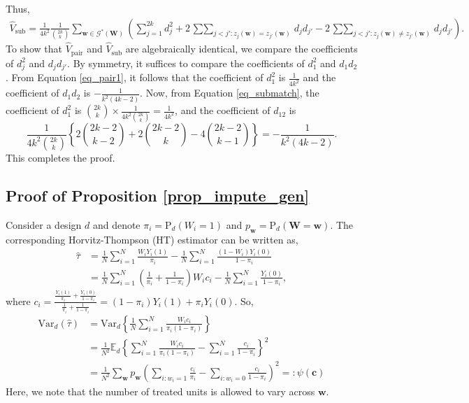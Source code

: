 \documentclass[12pt]{article}
\newcommand{\Var}{{\text{Var}}}
\newcommand{\E}{{\mathbb{E}}}
\renewcommand{\Pr}{{\text{P}}}
\begin{document}
Thus,
\begin{align}
    \hat{V}_{\text{sub}} = \frac{1}{4k^2}\frac{1}{\binom{2k}{k}} \sum_{\bm{w} \in \mathcal{G}^*(\bm{W})} \left(\sum_{j=1}^{2k}d^2_j + 2\mathop{\sum\sum}_{j <j':z_j(\bm{w}) = z_{j'}(\bm{w})}d_jd_{j'} - 2\mathop{\sum\sum}_{j <j':z_j(\bm{w}) \neq z_{j'}(\bm{w})}d_jd_{j'} \right). \label{eq_submatch}
\end{align}
To show that $\hat{V}_{\text{pair}}$ and $\hat{V}_{\text{sub}}$ are algebraically identical, we compare the coefficients of $d_j^2$ and $d_jd_{j'}$. By symmetry, it suffices to compare the coefficients of $d^2_1$ and $d_1d_2$. From Equation \ref{eq_pair1}, it follows that the coefficient of $d^2_1$ is $\frac{1}{4k^2}$ and the coefficient of $d_{1}d_{2}$ is $-\frac{1}{k^2(4k-2)}$. Now, from Equation \ref{eq_submatch}, the coefficient of $d^2_1$ is $\binom{2k}{k} \times \frac{1}{4k^2 \binom{2k}{k}} = \frac{1}{4k^2}$, and the coefficient of $d_{12}$ is
\begin{equation}
    \frac{1}{4k^2 \binom{2k}{k}}\left\{ 2\binom{2k-2}{k-2} + 2\binom{2k-2}{k} - 4\binom{2k-2}{k-1}  \right\} = -\frac{1}{k^2(4k-2)}.
\end{equation}
This completes the proof.
\subsection{Proof of Proposition \ref{prop_impute_gen}}
Consider a design $d$ and denote $\pi_i = \Pr_d(W_i = 1)$ and $p_{\bm{w}} = \Pr_d(\bm{W} = \bm{w})$. The corresponding Horvitz-Thompson (HT) estimator can be written as,
   \begin{align}
       \hat{\tau} &= \frac{1}{N}\sum_{i=1}^{N}\frac{W_i Y_i(1)}{\pi_i} - \frac{1}{N}\sum_{i=1}^{N}\frac{(1-W_i) Y_i(0)}{1-\pi_i} \nonumber \\
       & = \frac{1}{N}\sum_{i=1}^{N} \left(\frac{1}{\pi_i} + \frac{1}{1-\pi_i} \right)W_i c_i - \frac{1}{N}\sum_{i=1}^{N}\frac{Y_i(0)}{1-\pi_i}, 
   \end{align}
where $c_i = \frac{\frac{Y_i(1)}{\pi_i} + \frac{Y_i(0)}{1-\pi_i}}{\frac{1}{\pi_i} + \frac{1}{1-\pi_i}} = (1 - \pi_i)Y_i(1) + \pi_i Y_i(0)$. 
So,
\begin{align}
    \Var_d(\hat{\tau}) &= \Var_d\left\{\frac{1}{N}\sum_{i=1}^{N}\frac{W_ic_i}{\pi_i(1 - \pi_i)} \right\} \label{eq_A_impute_step0} \\
    & = \frac{1}{N^2}\E_d\left\{\sum_{i=1}^{N}\frac{W_ic_i}{\pi_i(1 - \pi_i)} - \sum_{i=1}^{N}\frac{c_i}{1-\pi_i} \right\}^2 \nonumber \\
    & = \frac{1}{N^2}\sum_{\bm{w}} p_{\bm{w}} \left(\sum_{i:w_{i} = 1}\frac{c_{i}}{\pi_{i}} - \sum_{i:w_{i} = 0}\frac{c_{i}}{1-\pi_{i}} \right)^2 =: \psi(\bm{c}) \label{eq_A_impute1}
\end{align}
Here, we note that the number of treated units is allowed to vary across $\bm{w}$. 
\end{document}
